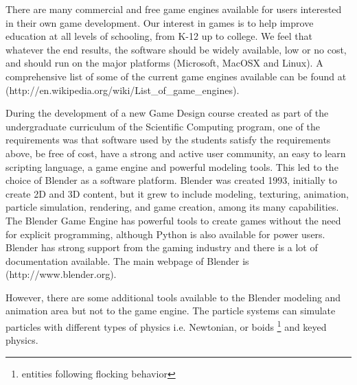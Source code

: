 


There are many commercial and free game engines available for users interested in their own game development. Our interest in games is to help improve education at all levels of schooling, from K-12 up to college. We feel that whatever the end results, the software should be widely available, low or no cost, and should run on the major platforms (Microsoft, MacOSX and Linux). A comprehensive list of some of the current game engines available can be found at (http://en.wikipedia.org/wiki/List\_of\_game\_engines).  




During the development of a new Game Design course created as part of the undergraduate curriculum of the Scientific Computing program, one of the requirements was that software used by the students satisfy the requirements above, be free of cost, have a strong and active user community, an easy to learn scripting language, a game engine and powerful modeling tools. This led to the choice of Blender as a software platform. Blender was created 1993, initially to create 2D and 3D content, but it grew to include modeling, texturing, animation, particle simulation, rendering, and game creation, among its many capabilities. The Blender Game Engine has powerful tools to create games without the need for explicit programming, although Python is also available for power users. Blender has strong support from the gaming industry and there is a lot of documentation available. The main webpage of Blender is (http://www.blender.org).  


However, there are some additional tools available to the Blender modeling and animation  area but not to the game engine. The particle systems can simulate particles with different types of physics i.e. Newtonian, or boids \footnote{entities following flocking behavior} and keyed physics. 

